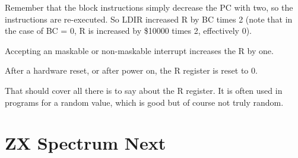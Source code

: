 \documentclass[12pt,twoside,openright,a4paper]{book}
\newcommand{\notet}{\rule{0pt}{2.4ex}}
\begin{document}
Remember that the block instructions simply decrease the PC with two, so the instructions are re-executed. So LDIR increased R by BC times 2 (note that in the case of BC = 0, R is increased by \$10000 times 2, effectively 0).

Accepting an maskable or non-maskable interrupt increases the R by one.

After a hardware reset, or after power on, the R register is reset to 0.

That should cover all there is to say about the R register. It is often used in programs for a random value, which is good but of course not truly random.


\chapter{ZX Spectrum Next}


\environbodyname\NEXTPORTBODY
{}
\newcommand{\PortBits}[1]{\tt #1\notet &}
\newcommand{\PortDesc}[1]{#1 \\}
\newcommand{\PortDescOnly}[1]{& \PortDesc{#1}}
\newcommand{\PortLink}[2]{{\small \textbf{#1} {\tt \$#2}}}

\environbodyname\PORTBITTABLEBODY
{}
\newcommand{\PortConfig}[2]{{\tt #1} & \PortDesc{#2}}
\end{document}
